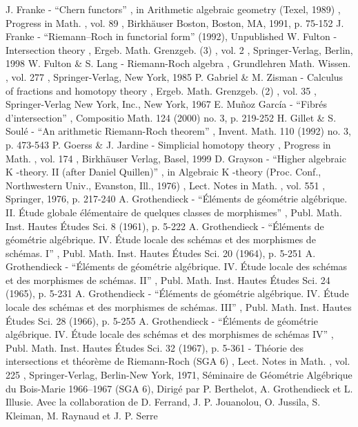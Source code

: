 J. Franke - “Chern functors” , in Arithmetic algebraic geometry (Texel, 1989) , Progress in Math. , vol. 89 , Birkhäuser Boston, Boston, MA, 1991, p. 75-152
 J. Franke - “Riemann–Roch in functorial form” (1992), Unpublished
 W. Fulton - Intersection theory , Ergeb. Math. Grenzgeb. (3) , vol. 2 , Springer-Verlag, Berlin, 1998
 W. Fulton \& S. Lang - Riemann-Roch algebra , Grundlehren Math. Wissen. , vol. 277 , Springer-Verlag, New York, 1985
 P. Gabriel \& M. Zisman - Calculus of fractions and homotopy theory , Ergeb. Math. Grenzgeb. (2) , vol. 35 , Springer-Verlag New York, Inc., New York, 1967
 E. Muñoz García - “Fibrés d’intersection” , Compositio Math. 124 (2000) no. 3, p. 219-252
 H. Gillet \& S. Soulé - “An arithmetic Riemann-Roch theorem” , Invent. Math. 110 (1992) no. 3, p. 473-543
 P. Goerss \& J. Jardine - Simplicial homotopy theory , Progress in Math. , vol. 174 , Birkhäuser Verlag, Basel, 1999
 D. Grayson - “Higher algebraic K -theory. II (after Daniel Quillen)” , in Algebraic K -theory (Proc. Conf., Northwestern Univ., Evanston, Ill., 1976) , Lect. Notes in Math. , vol. 551 , Springer, 1976, p. 217-240
 A. Grothendieck - “Éléments de géométrie algébrique. II. Étude globale élémentaire de quelques classes de morphismes” , Publ. Math. Inst. Hautes Études Sci. 8 (1961), p. 5-222
 A. Grothendieck - “Éléments de géométrie algébrique. IV. Étude locale des schémas et des morphismes de schémas. I” , Publ. Math. Inst. Hautes Études Sci. 20 (1964), p. 5-251
 A. Grothendieck - “Éléments de géométrie algébrique. IV. Étude locale des schémas et des morphismes de schémas. II” , Publ. Math. Inst. Hautes Études Sci. 24 (1965), p. 5-231
 A. Grothendieck - “Éléments de géométrie algébrique. IV. Étude locale des schémas et des morphismes de schémas. III” , Publ. Math. Inst. Hautes Études Sci. 28 (1966), p. 5-255
 A. Grothendieck - “Éléments de géométrie algébrique. IV. Étude locale des schémas et des morphismes de schémas IV” , Publ. Math. Inst. Hautes Études Sci. 32 (1967), p. 5-361
 - Théorie des intersections et théorème de Riemann-Roch (SGA 6) , Lect. Notes in Math. , vol. 225 , Springer-Verlag, Berlin-New York, 1971, Séminaire de Géométrie Algébrique du Bois-Marie 1966–1967 (SGA 6), Dirigé par P. Berthelot, A. Grothendieck et L. Illusie. Avec la collaboration de D. Ferrand, J. P. Jouanolou, O. Jussila, S. Kleiman, M. Raynaud et J. P. Serre
